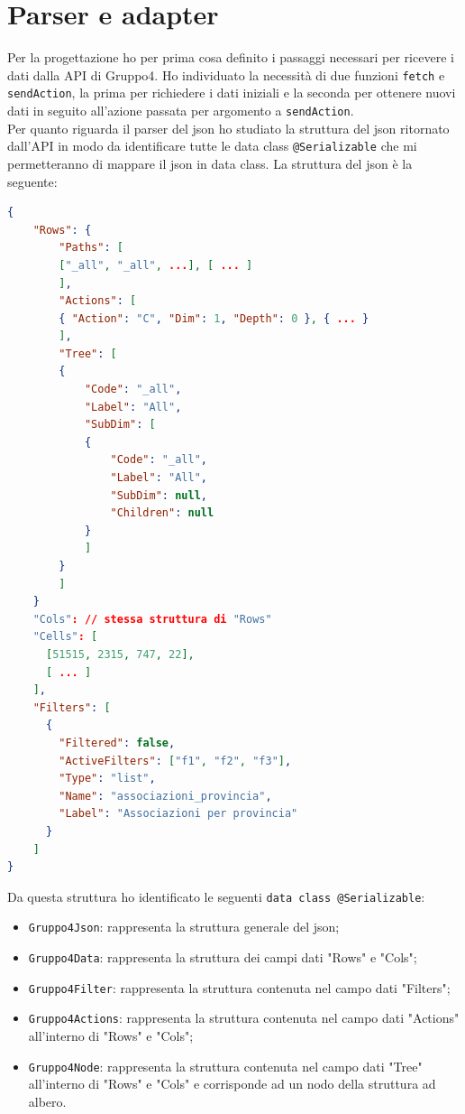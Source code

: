 \section{Parser e adapter}
Per la progettazione ho per prima cosa definito i passaggi necessari per ricevere i dati dalla API di Gruppo4. Ho individuato la necessità di due funzioni \verb|fetch| e \verb|sendAction|, la prima per richiedere i dati iniziali e la seconda per ottenere nuovi dati in seguito all'azione passata per argomento a \verb|sendAction|. \\
Per quanto riguarda il parser del json ho studiato la struttura del json ritornato dall'API in modo da identificare tutte le data class \verb|@Serializable| che mi permetteranno di mappare il json in data class. La struttura del json è la seguente:
\begin{lstlisting}[caption={Struttura JSON API}, label={lst:bodycells}, language=json]
{
	"Rows": {
		"Paths": [
		["_all", "_all", ...], [ ... ]
		],
		"Actions": [
		{ "Action": "C", "Dim": 1, "Depth": 0 }, { ... }
		],
		"Tree": [
		{
			"Code": "_all",
			"Label": "All",
			"SubDim": [
			{
				"Code": "_all",
				"Label": "All",
				"SubDim": null,
				"Children": null
			}
			]  
		}
		]
	}
	"Cols": // stessa struttura di "Rows"
	"Cells": [
	  [51515, 2315, 747, 22],
	  [ ... ]
	],
	"Filters": [
	  {
	    "Filtered": false,
	    "ActiveFilters": ["f1", "f2", "f3"],
	    "Type": "list",
	    "Name": "associazioni_provincia",
	    "Label": "Associazioni per provincia"
	  }
	]
}
\end{lstlisting}
Da questa struttura ho identificato le seguenti \verb|data class @Serializable|:
\begin{itemize}
	\item \verb|Gruppo4Json|: rappresenta la struttura generale del json;
	\item \verb|Gruppo4Data|: rappresenta la struttura dei campi dati "Rows" e "Cols";
	\item \verb|Gruppo4Filter|: rappresenta la struttura contenuta nel campo dati "Filters";
	\item \verb|Gruppo4Actions|: rappresenta la struttura contenuta nel campo dati "Actions" all'interno di "Rows" e "Cols";
	\item \verb|Gruppo4Node|: rappresenta la struttura contenuta nel campo dati "Tree" all'interno di "Rows" e "Cols" e corrisponde ad un nodo della struttura ad albero.
\end{itemize}

